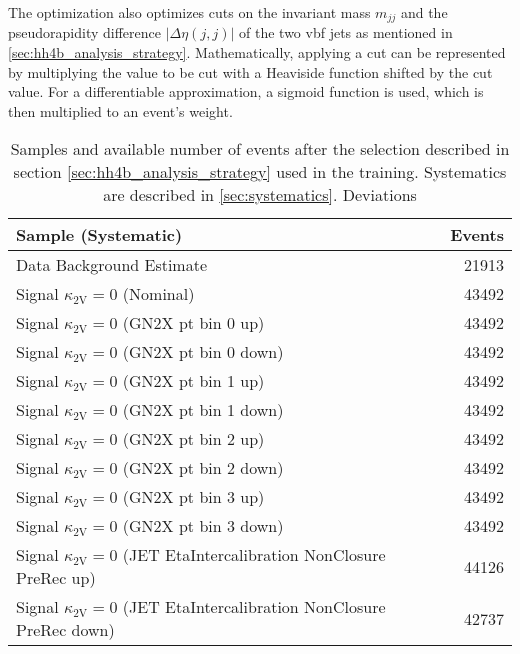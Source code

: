 The optimization also optimizes cuts on the invariant mass $m_{jj}$ and the pseudorapidity difference $|\Delta\eta(j,j)|$ of the two \ac{vbf} jets as mentioned in \ref{sec:hh4b_analysis_strategy}. Mathematically, applying a cut can be represented by multiplying the value to be cut with a Heaviside function shifted by the cut value. For a differentiable approximation, a sigmoid function is used, which is then multiplied to an event's weight.

\begin{table}[]
    \centering
    \caption{Samples and available number of events after the selection described in section \ref{sec:hh4b_analysis_strategy} used in the training. Systematics are described in \ref{sec:systematics}. Deviations }
    \begin{tabular}{lr}
        \hline
        Sample (Systematic)                                                            & Events \\ \hline \hline
        Data Background Estimate                                                       & 21913  \\ \hline
        Signal $\kappa_\mathrm{2V}=0$ (Nominal)                                        & 43492  \\
        Signal $\kappa_\mathrm{2V}=0$ (GN2X pt bin 0 up)                               & 43492  \\
        Signal $\kappa_\mathrm{2V}=0$ (GN2X pt bin 0 down)                             & 43492  \\
        Signal $\kappa_\mathrm{2V}=0$ (GN2X pt bin 1 up)                               & 43492  \\
        Signal $\kappa_\mathrm{2V}=0$ (GN2X pt bin 1 down)                             & 43492  \\
        Signal $\kappa_\mathrm{2V}=0$ (GN2X pt bin 2 up)                               & 43492  \\
        Signal $\kappa_\mathrm{2V}=0$ (GN2X pt bin 2 down)                             & 43492  \\
        Signal $\kappa_\mathrm{2V}=0$ (GN2X pt bin 3 up)                               & 43492  \\
        Signal $\kappa_\mathrm{2V}=0$ (GN2X pt bin 3 down)                             & 43492  \\
        Signal $\kappa_\mathrm{2V}=0$ (JET EtaIntercalibration NonClosure PreRec up)   & 44126  \\
        Signal $\kappa_\mathrm{2V}=0$ (JET EtaIntercalibration NonClosure PreRec down) & 42737  \\

\end{tabular}
\end{table}
